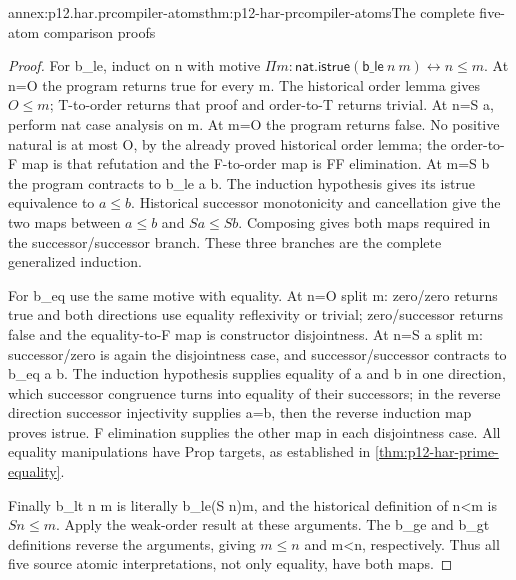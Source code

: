 \begin{annexitem}{annex:p12.har.prcompiler-atoms}{thm:p12-har-prcompiler-atoms}{The complete five-atom comparison proofs}
\begin{proof}
For b\_le, induct on n with motive
\(\Pi m:\mathsf{nat}.
\mathsf{istrue}(\mathsf{b\_le}\ n\ m)\leftrightarrow n\le m\).
At n=O the program returns true for every m. The historical order
lemma gives \(O\le m\); T-to-order returns that proof and
order-to-T returns trivial. At n=S a, perform nat case analysis on m.
At m=O the program returns false. No positive natural is at most O,
by the already proved historical order lemma; the order-to-F map is
that refutation and the F-to-order map is FF elimination. At m=S b
the program contracts to b\_le a b. The induction hypothesis gives
its istrue equivalence to \(a\le b\). Historical successor
monotonicity and cancellation give the two maps between
\(a\le b\) and \(S a\le S b\). Composing gives both maps
required in the successor/successor branch. These three branches
are the complete generalized induction.

For b\_eq use the same motive with equality. At n=O split m:
zero/zero returns true and both directions use equality reflexivity
or trivial; zero/successor returns false and the equality-to-F map
is constructor disjointness. At n=S a split m: successor/zero is
again the disjointness case, and successor/successor contracts to
b\_eq a b. The induction hypothesis supplies equality of a and b
in one direction, which successor congruence turns into equality of
their successors; in the reverse direction successor injectivity
supplies a=b, then the reverse induction map proves istrue. F
elimination supplies the other map in each disjointness case.
All equality manipulations have Prop targets, as established in
\cref{thm:p12-har-prime-equality}.

Finally b\_lt n m is literally b\_le(S n)m, and the historical
definition of n<m is \(S n\le m\). Apply the weak-order result at
these arguments. The b\_ge and b\_gt definitions reverse the
arguments, giving \(m\le n\) and m<n, respectively. Thus all five
source atomic interpretations, not only equality, have both maps.
\end{proof}
\end{annexitem}

